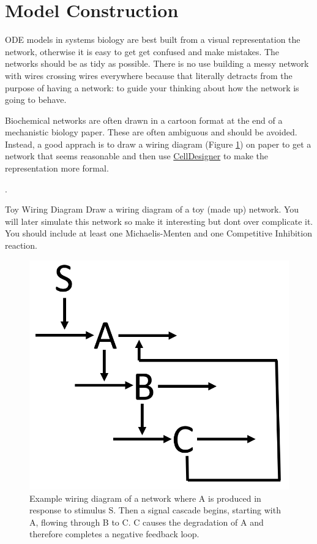 \documentclass[../../main]{subfiles}
\begin{document}
    \section{Model Construction}
    ODE models in systems biology are best built from a visual representation the network, otherwise it
    is easy to get get confused and make mistakes. The networks should be as tidy as possible. There is no use
    building a messy network with wires crossing wires everywhere because that literally detracts from the
    purpose of having a network: to guide your thinking about how the network is going to behave.

    Biochemical networks are often drawn in a cartoon format at the end of a mechanistic biology paper. These are often
    ambiguous and should be avoided. Instead, a good apprach is to draw a wiring diagram (Figure \ref{fig:model_construction:wiring_diagram})
    on paper to get a network that seems reasonable and then use \href{http://www.celldesigner.org/}{CellDesigner} to make the representation
    more formal.

    .


    \begin{Task}[label=ToyWiringDiagram]{Toy Wiring Diagram}
        Draw a wiring diagram of a toy (made up) network. You will later simulate this network so make it interesting
        but dont over complicate it. You should include at least one Michaelis-Menten and one Competitive Inhibition
        reaction.
    \end{Task}

    \begin{figure}[t]
        \centering
        \includegraphics[width=0.5\linewidth]{ODEModels/ModelConstruction/assets/wiring_diagram.png}
        \caption[wiring diagram]{Example wiring diagram of a network where A is produced in response to stimulus S.
        Then a signal cascade begins, starting with A, flowing through B to C. C causes the degradation of A and
        therefore completes a negative feedback loop.}
        \label{fig:model_construction:wiring_diagram}
    \end{figure}
\end{document}
